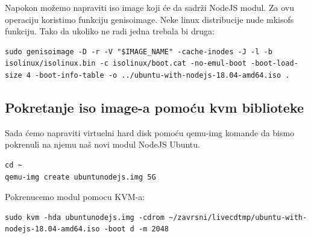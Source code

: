 \documentclass[12pt,vi]{mitthesis}
\begin{document}
\noindent
Napokon možemo napraviti iso image koji će da sadrži NodeJS modul. Za ovu operaciju koristimo funkciju genisoimage. Neke linux distribucije nude mkisofs funkciju. Tako da ukoliko ne radi jedna trebala bi druga:
\begin{lstlisting}[style=BashInputStyle]
sudo genisoimage -D -r -V "$IMAGE_NAME" -cache-inodes -J -l -b isolinux/isolinux.bin -c isolinux/boot.cat -no-emul-boot -boot-load-size 4 -boot-info-table -o ../ubuntu-with-nodejs-18.04-amd64.iso .
\end{lstlisting}

\subsection*{Pokretanje iso image-a pomoću kvm biblioteke}
\indent
Sada ćemo napraviti virtuelni hard disk pomoću qemu-img komande da bismo pokrenuli na njemu naš novi modul NodeJS Ubuntu.
\begin{lstlisting}[style=BashInputStyle]
cd ~
qemu-img create ubuntunodejs.img 5G
\end{lstlisting}

\noindent 
Pokrenucemo modul pomocu KVM-a:
\begin{lstlisting}[style=BashInputStyle]
sudo kvm -hda ubuntunodejs.img -cdrom ~/zavrsni/livecdtmp/ubuntu-with-nodejs-18.04-amd64.iso -boot d -m 2048
\end{lstlisting}
\end{document}
